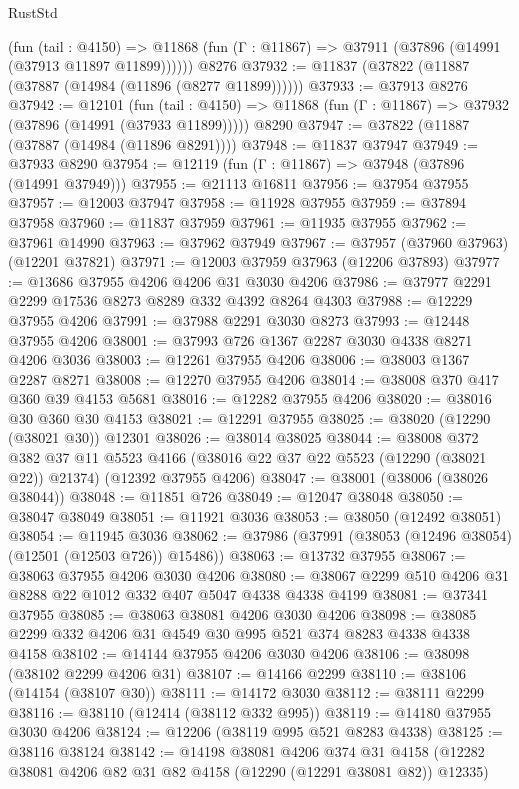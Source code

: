 \begin{lexlean}{RustStd}
\begin{coremodule}
{\begin{coremodule}
{{{{{{{{{{{{{{{{{{{{{{{{{{{{{{{{{{{{{{{{{{{{{{{{{{      (fun (tail : @4150) =>
      @11868 (fun (Γ : @11867) => @37911 (@37896 (@14991 (@37913 @11897 @11899))))))
    @8276
@37932 := @11837 (@37822 (@11887 (@37887 (@14984 (@11896 (@8277 @11899))))))
@37933 := @37913 @8276
@37942 := @12101
    (fun (tail : @4150) => @11868 (fun (Γ : @11867) => @37932 (@37896 (@14991 (@37933 @11899)))))
    @8290
@37947 := @37822 (@11887 (@37887 (@14984 (@11896 @8291))))
@37948 := @11837 @37947
@37949 := @37933 @8290
@37954 := @12119 (fun (Γ : @11867) => @37948 (@37896 (@14991 @37949)))
@37955 := @21113 @16811
@37956 := @37954 @37955
@37957 := @12003 @37947
@37958 := @11928 @37955
@37959 := @37894 @37958
@37960 := @11837 @37959
@37961 := @11935 @37955
@37962 := @37961 @14990
@37963 := @37962 @37949
@37967 := @37957 (@37960 @37963) (@12201 @37821)
@37971 := @12003 @37959 @37963 (@12206 @37893)
@37977 := @13686 @37955 @4206 @4206 @31 @3030 @4206
@37986 := @37977 @2291 @2299 @17536 @8273 @8289 @332 @4392 @8264 @4303
@37988 := @12229 @37955 @4206
@37991 := @37988 @2291 @3030 @8273
@37993 := @12448 @37955 @4206
@38001 := @37993 @726 @1367 @2287 @3030 @4338 @8271 @4206 @3036
@38003 := @12261 @37955 @4206
@38006 := @38003 @1367 @2287 @8271
@38008 := @12270 @37955 @4206
@38014 := @38008 @370 @417 @360 @39 @4153 @5681
@38016 := @12282 @37955 @4206
@38020 := @38016 @30 @360 @30 @4153
@38021 := @12291 @37955
@38025 := @38020 (@12290 (@38021 @30)) @12301
@38026 := @38014 @38025
@38044 := @38008
    @372
    @382
    @37
    @11
    @5523
    @4166
    (@38016 @22 @37 @22 @5523 (@12290 (@38021 @22)) @21374)
    (@12392 @37955 @4206)
@38047 := @38001 (@38006 (@38026 @38044))
@38048 := @11851 @726
@38049 := @12047 @38048
@38050 := @38047 @38049
@38051 := @11921 @3036
@38053 := @38050 (@12492 @38051)
@38054 := @11945 @3036
@38062 := @37986 (@37991 (@38053 (@12496 @38054) (@12501 (@12503 @726)) @15486))
@38063 := @13732 @37955
@38067 := @38063 @37955 @4206 @3030 @4206
@38080 := @38067 @2299 @510 @4206 @31 @8288 @22 @1012 @332 @407 @5047 @4338 @4338 @4199
@38081 := @37341 @37955
@38085 := @38063 @38081 @4206 @3030 @4206
@38098 := @38085 @2299 @332 @4206 @31 @4549 @30 @995 @521 @374 @8283 @4338 @4338 @4158
@38102 := @14144 @37955 @4206 @3030 @4206
@38106 := @38098 (@38102 @2299 @4206 @31)
@38107 := @14166 @2299
@38110 := @38106 (@14154 (@38107 @30))
@38111 := @14172 @3030
@38112 := @38111 @2299
@38116 := @38110 (@12414 (@38112 @332 @995))
@38119 := @14180 @37955 @3030 @4206
@38124 := @12206 (@38119 @995 @521 @8283 @4338)
@38125 := @38116 @38124
@38142 := @14198
    @38081
    @4206
    @374
    @31
    @4158
    (@12282 @38081 @4206 @82 @31 @82 @4158 (@12290 (@12291 @38081 @82)) @12335)
}}}}}}}}}}}}}}}}}}}}}}}}}}}}}}}}}}}}}}}}}}}}}}}}}}
\end{coremodule}}
\end{coremodule}
\end{lexlean}
